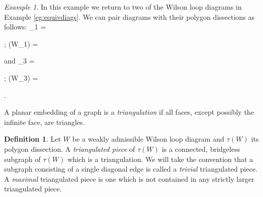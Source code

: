 \documentclass[11pt]{article}
\newcommand{\drawWLD}[2]{

\pgfmathsetmacro{\n}{#1}
\pgfmathsetmacro{\radius}{#2}
\pgfmathsetmacro{\angle}{360/\n}
\draw (0,0) circle (\radius);
    \foreach \i in {1,2,...,\n} {
      \draw (\angle*\i:\radius) node {$\bullet$};
    }

}
\newcommand{\drawpolypart}[2]{
\pgfmathsetmacro{\n}{#1}
\pgfmathsetmacro{\radius}{#2}
\pgfmathsetmacro{\angle}{360/\n}
    \foreach \i in {1,2,...,\n} {
      \draw (\angle*\i+ \angle/2:\radius) node {$\bullet$};
     \pgfmathsetmacro{\x}{\angle*\i - \angle/2}
      \pgfmathsetmacro{\concave}{((\n-1.5)/\n)}
      \draw (\x:\radius cm) .. controls (\angle *\i: \concave* \radius cm) .. (\x + \angle:\radius cm);
    }

}
\newcommand{\drawprop}[4]{
\pgfmathsetmacro{\r}{#1}
\pgfmathsetmacro{\bumpr}{#2}
\pgfmathsetmacro{\s}{#3}
\pgfmathsetmacro{\bumps}{#4}
\pgfmathsetmacro{\perturbe}{\angle/\n}

\begin{scope}
\draw[propagator] (\angle*\r + \angle/2 + \bumpr*\perturbe:\radius) -- (\angle*\s + \angle/2 + \bumps*\perturbe:\radius);
\end{scope}
}
\newcommand{\drawchord}[2]{
\pgfmathsetmacro{\r}{#1}
\pgfmathsetmacro{\s}{#2}

\begin{scope}
\draw (\angle*\r + \angle/2:\radius) -- (\angle*\s + \angle/2:\radius);
\end{scope}
}
\newcommand{\drawnumbers}{
  \foreach \i in {1,2,...,\n} {
  \pgfmathsetmacro{\x}{\angle*\i}
  \draw (\x:\radius*1.15) node {\footnotesize \i};
}
}
\newcommand{\drawnumbersshift}{
  \foreach \i in {1,2,...,\n} {
  \pgfmathsetmacro{\x}{\angle*\i + \angle/2}
  \draw (\x:\radius*1.15) node {\footnotesize \i};
}
}
\def\bas #1\eas{\begin{align*} #1 \end{align*}}
\theoremstyle{remark}
\newtheorem{eg}[thm]{Example}
\theoremstyle{definition}
\newtheorem{dfn}[thm]{Definition}
\begin{document}
\begin{eg}\label{WLDtopolygonpartition}
In this example we return to two of the Wilson loop diagrams in Example \ref{eg:equivdiags}. We can pair diagrams with their polygon dissections as follows:
\bas W_1 =  \quad; \quad
\tau(W_1) = 
\eas and
\bas W_3 = \quad; \quad
\tau(W_3) =  .
\eas

\end{eg}

A planar embedding of a graph is a \emph{triangulation} if all faces, except possibly the infinite face, are triangles.

\begin{dfn}
  Let $W$ be a weakly admissible Wilson loop diagram and $\tau(W)$ its polygon dissection. A \emph{triangulated piece} of $\tau(W)$ is a connected, bridgeless subgraph of $\tau(W)$ which is a triangulation. We will take the convention that a subgraph consisting of a single diagonal edge is called a \emph{trivial} triangulated piece.
A {\em maximal} triangulated piece is one which is not contained in any strictly larger triangulated piece.
\end{dfn}
\end{document}
